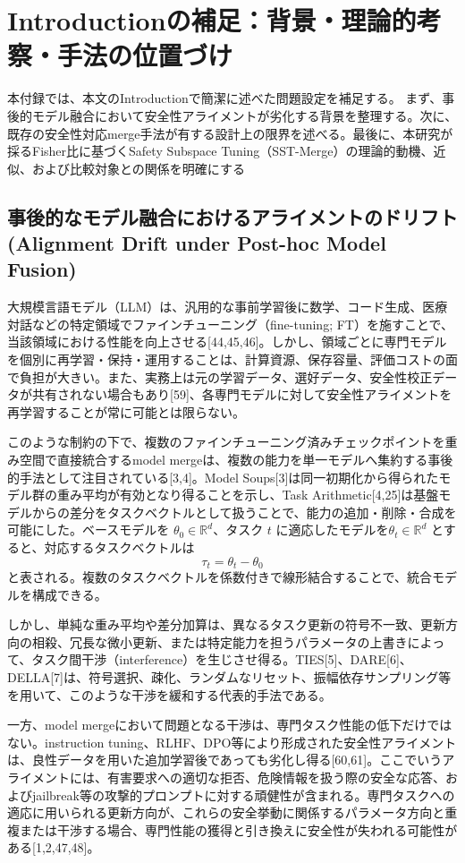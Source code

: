 \section{Introductionの補足：背景・理論的考察・手法の位置づけ}
\label{app:introduction}
本付録では、本文のIntroductionで簡潔に述べた問題設定を補足する。
まず、事後的モデル融合において安全性アライメントが劣化する背景を整理する。次に、既存の安全性対応merge手法が有する設計上の限界を述べる。最後に、本研究が採るFisher比に基づくSafety Subspace Tuning（SST-Merge）の理論的動機、近似、および比較対象との関係を明確にする

\subsection{事後的なモデル融合におけるアライメントのドリフト(Alignment Drift under Post-hoc Model Fusion)}
大規模言語モデル（LLM）は、汎用的な事前学習後に数学、コード生成、医療対話などの特定領域でファインチューニング（fine-tuning; FT）を施すことで、当該領域における性能を向上させる[44,45,46]。しかし、領域ごとに専門モデルを個別に再学習・保持・運用することは、計算資源、保存容量、評価コストの面で負担が大きい。また、実務上は元の学習データ、選好データ、安全性校正データが共有されない場合もあり[59]、各専門モデルに対して安全性アライメントを再学習することが常に可能とは限らない。

このような制約の下で、複数のファインチューニング済みチェックポイントを重み空間で直接統合するmodel mergeは、複数の能力を単一モデルへ集約する事後的手法として注目されている[3,4]。Model Soups[3]は同一初期化から得られたモデル群の重み平均が有効となり得ることを示し、Task Arithmetic[4,25]は基盤モデルからの差分をタスクベクトルとして扱うことで、能力の追加・削除・合成を可能にした。ベースモデルを
\(\theta_0 \in \mathbb{R}^d\)、タスク \(t\) に適応したモデルを\(\theta_t \in \mathbb{R}^d\) とすると、対応するタスクベクトルは
\[
\tau_t = \theta_t - \theta_0
\]
と表される。複数のタスクベクトルを係数付きで線形結合することで、統合モデルを構成できる。

しかし、単純な重み平均や差分加算は、異なるタスク更新の符号不一致、更新方向の相殺、冗長な微小更新、または特定能力を担うパラメータの上書きによって、タスク間干渉（interference）を生じさせ得る。TIES[5]、DARE[6]、DELLA[7]は、符号選択、疎化、ランダムなリセット、振幅依存サンプリング等を用いて、このような干渉を緩和する代表的手法である。

一方、model mergeにおいて問題となる干渉は、専門タスク性能の低下だけではない。instruction tuning、RLHF、DPO等により形成された安全性アライメントは、良性データを用いた追加学習後であっても劣化し得る[60,61]。ここでいうアライメントには、有害要求への適切な拒否、危険情報を扱う際の安全な応答、およびjailbreak等の攻撃的プロンプトに対する頑健性が含まれる。専門タスクへの適応に用いられる更新方向が、これらの安全挙動に関係するパラメータ方向と重複または干渉する場合、専門性能の獲得と引き換えに安全性が失われる可能性がある[1,2,47,48]。

